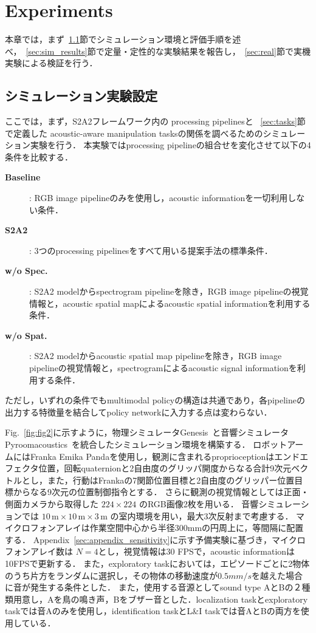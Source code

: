 \documentclass{article}
\begin{document}
\section{Experiments}
\label{sec:result}
	本章では，まず~\ref{sec:sim_setup}節でシミュレーション環境と評価手順を述べ，~\ref{sec:sim_results}節で定量・定性的な実験結果を報告し，~\ref{sec:real}節で実機実験による検証を行う．

\subsection{シミュレーション実験設定}
\label{sec:sim_setup}
	ここでは，まず，S2A2フレームワーク内の processing pipelinesと
	~\ref{sec:tasks}節で定義した acoustic-aware manipulation tasksの関係を調べるためのシミュレーション実験を行う．
	本実験ではprocessing pipelineの組合せを変化させて以下の4条件を比較する．
	\begin{description}
		\item[\textbf{Baseline}]: RGB image pipelineのみを使用し，acoustic informationを一切利用しない条件．
		\item[\textbf{S2A2}]: 3つのprocessing pipelinesをすべて用いる提案手法の標準条件．
		\item[\textbf{w/o Spec.}]: S2A2 modelからspectrogram pipelineを除き，RGB image pipelineの視覚情報と，acoustic spatial mapによるacoustic spatial informationを利用する条件．
		\item[\textbf{w/o Spat.}]: S2A2 modelからacoustic spatial map pipelineを除き，RGB image pipelineの視覚情報と，spectrogramによるacoustic signal informationを利用する条件．
	\end{description}
	ただし，いずれの条件でもmultimodal policyの構造は共通であり，各pipelineの出力する特徴量を結合してpolicy networkに入力する点は変わらない．

	Fig.~\ref{fig:fig2}に示すように，物理シミュレータGenesis~\citep{Genesis}と音響シミュレータPyroomacoustics~\citep{pyroomacoustics}を統合したシミュレーション環境を構築する．
	ロボットアームにはFranka Emika Pandaを使用し，観測に含まれるproprioceptionはエンドエフェクタ位置，回転quaternionと2自由度のグリッパ開度からなる合計9次元ベクトルとし，また，行動はFrankaの7関節位置目標と2自由度のグリッパー位置目標からなる9次元の位置制御指令とする．
	さらに観測の視覚情報としては正面・側面カメラから取得した $224 \times 224$ のRGB画像2枚を用いる．
	音響シミュレーションでは $10\,\mathrm{m}\times10\,\mathrm{m}\times3\,\mathrm{m}$ の室内環境を用い，最大3次反射まで考慮する．
	マイクロフォンアレイは作業空間中心から半径300mmの円周上に，等間隔に配置する．
	Appendix~\ref{sec:appendix_sensitivity}に示す予備実験に基づき，マイクロフォンアレイ数は $N=4$とし，視覚情報は30 FPSで，acoustic informationは10FPSで更新する．
	また，exploratory taskにおいては，エピソードごとに2物体のうち片方をランダムに選択し，その物体の移動速度が$0.5mm/s$を越えた場合に音が発生する条件とした．
	また，使用する音源としてsound type AとBの２種類用意し，Aを鳥の鳴き声，Bをブザー音とした．localization taskとexploratory taskでは音Aのみを使用し，identification taskとL\&I taskでは音AとBの両方を使用している．
	
\end{document}
